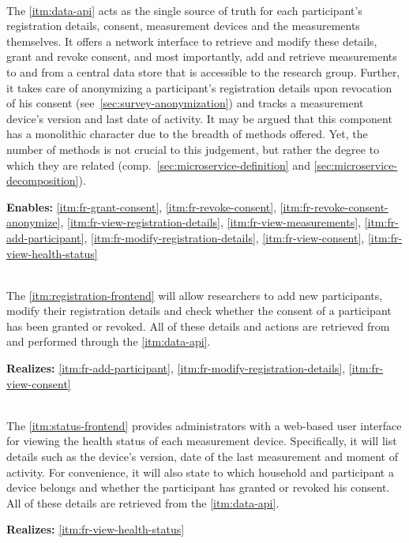 \begin{description}[format={\storedescriptionlabel}]
  \item[Data \acs{API}\label{itm:data-api}]
  \hfill \\
  The \ref{itm:data-api} acts as the single source of truth for each participant's registration details, consent, measurement devices and the measurements themselves. It offers a network interface to retrieve and modify these details, grant and revoke consent, and most importantly, add and retrieve measurements to and from a central data store that is accessible to the research group. Further, it takes care of anonymizing a participant's registration details upon revocation of his consent (see~\autoref{sec:survey-anonymization}) and tracks a measurement device's version and last date of activity. It may be argued that this component has a monolithic character due to the breadth of methods offered. Yet, the number of methods is not crucial to this judgement, but rather the degree to which they are related (comp.~\autoref{sec:microservice-definition} and \autoref{sec:microservice-decomposition}).

  \textbf{Enables:} \ref{itm:fr-grant-consent}, \ref{itm:fr-revoke-consent}, \ref{itm:fr-revoke-consent-anonymize}, \ref{itm:fr-view-registration-details}, \ref{itm:fr-view-measurements}, \ref{itm:fr-add-participant}, \ref{itm:fr-modify-registration-details}, \ref{itm:fr-view-consent}, \ref{itm:fr-view-health-status}

  \item[Registration Frontend\label{itm:registration-frontend}]
  \hfill \\
  The \ref{itm:registration-frontend} will allow researchers to add new participants, modify their registration details and check whether the consent of a participant has been granted or revoked. All of these details and actions are retrieved from and performed through the \ref{itm:data-api}.

  \textbf{Realizes:} \ref{itm:fr-add-participant}, \ref{itm:fr-modify-registration-details}, \ref{itm:fr-view-consent}

  \item[Status Frontend\label{itm:status-frontend}]
  \hfill \\
  The \ref{itm:status-frontend} provides administrators with a web-based user interface for viewing the health status of each measurement device. Specifically, it will list details such as the device's version, date of the last measurement and moment of activity. For convenience, it will also state to which household and participant a device belongs and whether the participant has granted or revoked his consent. All of these details are retrieved from the \ref{itm:data-api}.

  \textbf{Realizes:} \ref{itm:fr-view-health-status}
\end{description}


